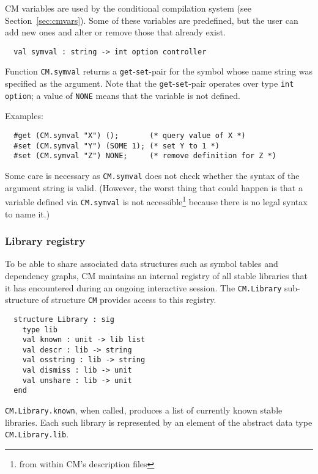 \documentclass[titlepage,letterpaper]{article}
\begin{document}
CM variables are used by the conditional compilation system (see
Section~\ref{sec:cmvars}).  Some of these variables are predefined,
but the user can add new ones and alter or remove those that already
exist.

\begin{verbatim}
  val symval : string -> int option controller
\end{verbatim}

Function {\tt CM.symval} returns a {\tt get}-{\tt set}-pair for the
symbol whose name string was specified as the argument.  Note that the
{\tt get}-{\tt set}-pair operates over type {\tt int option}; a value
of {\tt NONE} means that the variable is not defined.

\noindent Examples:
\begin{verbatim}
  #get (CM.symval "X") ();       (* query value of X *)
  #set (CM.symval "Y") (SOME 1); (* set Y to 1 *)
  #set (CM.symval "Z") NONE;     (* remove definition for Z *)
\end{verbatim}

Some care is necessary as {\tt CM.symval} does not check whether the
syntax of the argument string is valid.  (However, the worst thing
that could happen is that a variable defined via {\tt CM.symval} is
not accessible\footnote{from within CM's description files} because
there is no legal syntax to name it.)

\subsubsection*{Library registry}
\label{sec:libreg}

To be able to share associated data structures such as symbol tables
and dependency graphs, CM maintains an internal registry of all stable
libraries that it has encountered during an ongoing interactive
session.  The {\tt CM.Library} sub-structure of structure {\tt CM}
provides access to this registry.

\begin{verbatim}
  structure Library : sig
    type lib
    val known : unit -> lib list
    val descr : lib -> string
    val osstring : lib -> string
    val dismiss : lib -> unit
    val unshare : lib -> unit
  end
\end{verbatim}

{\tt CM.Library.known}, when called, produces a list of currently
known stable libraries.  Each such library is represented by an
element of the abstract data type {\tt CM.Library.lib}.
\end{document}
